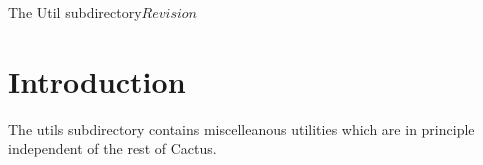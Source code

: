%   

\begin{cactuspart}{8}{The Util subdirectory}{}{$Revision$}
\renewcommand{\thepage}{\Alph{part}\arabic{page}}

\chapter{Introduction}

The utils subdirectory contains miscelleanous utilities which are in 
principle independent of the rest of Cactus.

\end{cactuspart}
